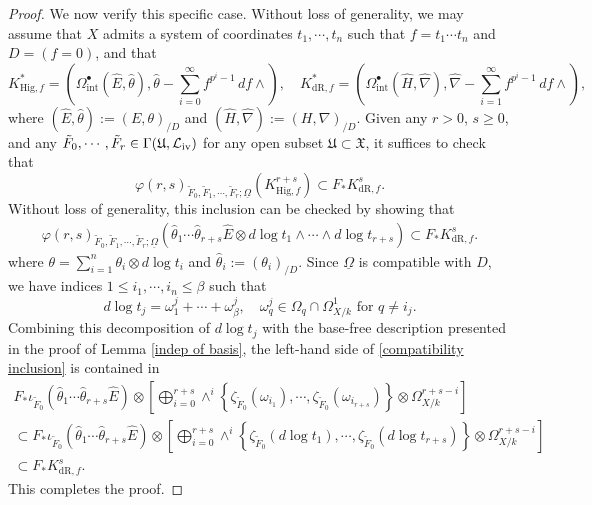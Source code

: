 \documentclass[12pt, a4paper]{article}
\begin{document}
\begin{proof}
We now verify this specific case. Without loss of generality, we may assume that \( X \) admits a system of coordinates \( t_1, \cdots, t_n \) such that \( f = t_1 \cdots t_n \) and \( D = (f = 0) \), and that
\[
K^*_{\mathrm{Hig},f} = \left( \Omega^\bullet_{\mathrm{int}}(\hat E, \hat\theta), \hat\theta - \sum_{i=0}^\infty f^{p^i - 1} \, df \wedge \right), \quad
K^*_{\mathrm{dR},f} = \left( \Omega^\bullet_{\mathrm{int}}(\hat H, \hat\nabla), \hat\nabla - \sum_{i=1}^\infty f^{p^i - 1} \, df \wedge \right),
\]
where \( (\hat E, \hat\theta) := (E, \theta)_{/D} \) and \( (\hat H, \hat\nabla) := (H, \nabla)_{/D} \).
Given any \( r > 0 \), \( s \geq 0 \), and any \( \tilde F_0, \cdots, \tilde F_r \in \Gamma(\mathfrak U, \mathcal L_{\mathrm{\uppercase\expandafter{\romannumeral4}}}) \) for any open subset \( \mathfrak U \subset \mathfrak X \), it suffices to check that
\[
\varphi(r,s)_{\tilde F_0, \tilde F_1, \cdots, \tilde F_r;\underline\Omega}(K^{r+s}_{\mathrm{Hig},f}) \subset F_* K^s_{\mathrm{dR},f}.
\]
Without loss of generality, this inclusion can be checked by showing that
\begin{eqnarray}\label{compatibility inclusion}
\varphi(r,s)_{\tilde F_0, \tilde F_1, \cdots, \tilde F_r;\underline\Omega} \left( \hat\theta_1 \cdots \hat\theta_{r+s} \hat E \otimes d\log t_1 \wedge \cdots \wedge d\log t_{r+s} \right) \subset F_* K^s_{\mathrm{dR},f}.
\end{eqnarray}
where \( \theta = \sum_{i=1}^n \theta_i \otimes d\log t_i \) and \( \hat\theta_i := (\theta_i)_{/D} \). Since \( \underline\Omega \) is compatible with \( D \), we have indices \( 1 \leq i_1, \cdots, i_n \leq \beta \) such that
\[
d\log t_j = \omega^j_1 + \cdots + \omega^j_\beta, \quad \omega^j_q \in \Omega_q \cap \Omega^1_{X/k} \text{ for } q \neq i_j.
\]
Combining this decomposition of \( d\log t_j \) with the base-free description presented in the proof of Lemma \ref{indep of basis}, the left-hand side of \eqref{compatibility inclusion} is contained in
\[
\begin{array}{c}
F_* \iota_{\tilde F_0} \left( \hat\theta_1 \cdots \hat\theta_{r+s} \hat E \right) \otimes \left[ \bigoplus_{i=0}^{r+s} \wedge^i \left\{ \zeta_{\tilde F_0}(\omega_{i_1}), \cdots, \zeta_{\tilde F_0}(\omega_{i_{r+s}}) \right\} \otimes \Omega^{r+s-i}_{X/k} \right] \\
\subset F_* \iota_{\tilde F_0} \left( \hat\theta_1 \cdots \hat\theta_{r+s} \hat E \right) \otimes \left[ \bigoplus_{i=0}^{r+s} \wedge^i \left\{ \zeta_{\tilde F_0}(d\log t_1), \cdots, \zeta_{\tilde F_0}(d\log t_{r+s}) \right\} \otimes \Omega^{r+s-i}_{X/k} \right] \\
\subset F_* K^s_{\mathrm{dR},f}.
\end{array}
\]
This completes the proof.
\end{proof}
\end{document}
